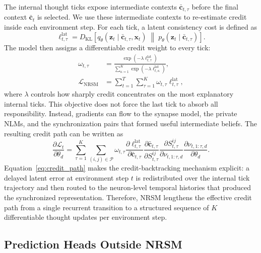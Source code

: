 \documentclass{article}
\begin{document}
The internal thought ticks expose intermediate contexts $\bar{\mathbf c}_{t,\tau}$ before the final context $\bar{\mathbf c}_t$ is selected. We use these intermediate contexts to re-estimate credit inside each environment step. For each tick, a latent consistency cost is defined as
\begin{equation}
\ell^{\mathrm{lat}}_{t,\tau}
=
D_{\mathrm{KL}}\!\left[
q_{\theta}(\mathbf z_t\mid \bar{\mathbf c}_{t,\tau},\mathbf x_t)
\;\middle\|\;
p_{\theta}(\mathbf z_t\mid \bar{\mathbf c}_{t,\tau})
\right].
\label{eq:tick_latent_cost}
\end{equation}
The model then assigns a differentiable credit weight to every tick:
\begin{align}
\omega_{t,\tau}
&=
\frac{\exp(-\lambda \ell^{\mathrm{lat}}_{t,\tau})}
{\sum_{\kappa=1}^{K}
\exp(-\lambda \ell^{\mathrm{lat}}_{t,\kappa})},
\label{eq:credit_weight}\\
\mathcal L_{\text{NRSM}}
&=
\sum_{t=1}^{T}\sum_{\tau=1}^{K}\omega_{t,\tau}\ell^{\mathrm{lat}}_{t,\tau},
\label{eq:credit_reestimate}
\end{align}
where $\lambda$ controls how sharply credit concentrates on the most explanatory internal ticks. This objective does not force the last tick to absorb all responsibility. Instead, gradients can flow to the synapse model, the private NLMs, and the synchronization pairs that formed useful intermediate beliefs. The resulting credit path can be written as
\begin{equation}
\frac{\partial \mathcal L_t}{\partial \theta_d}
=
\sum_{\tau=1}^{K}\sum_{(i,j)\in\mathcal P}
\omega_{t,\tau}
\frac{\partial \ell^{\mathrm{lat}}_{t,\tau}}{\partial \bar{\mathbf c}_{t,\tau}}
\frac{\partial \bar{\mathbf c}_{t,\tau}}{\partial S^{ij}_{t,\tau}}
\frac{\partial S^{ij}_{t,\tau}}{\partial \nu_{t,1:\tau,d}}
\frac{\partial \nu_{t,1:\tau,d}}{\partial \theta_d}.
\label{eq:credit_path}
\end{equation}
Equation~\eqref{eq:credit_path} makes the credit-backtracking mechanism explicit: a delayed latent error at environment step $t$ is redistributed over the internal tick trajectory and then routed to the neuron-level temporal histories that produced the synchronized representation. Therefore, NRSM lengthens the effective credit path from a single recurrent transition to a structured sequence of $K$ differentiable thought updates per environment step.

\subsection{Prediction Heads Outside NRSM}
\end{document}
